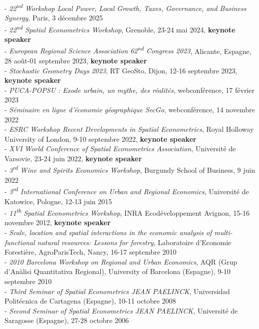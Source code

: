 \documentclass[a4paper,12pt]{article}
\begin{document}
\noindent - \textit{22\textsuperscript{nd} Workshop Local Power, Local Growth, Taxes, Governance, and Business Synergy}, Paris, 3 décembre 2025\\
- \textit{22\textsuperscript{nd} Spatial Econometrics Workshop}, Grenoble, 23-24 mai 2024, \textbf{keynote speaker}\\
- \textit{European Regional Science Association 62\textsuperscript{nd} Congress 2023}, Alicante, Espagne, 28 août-01 septembre 2023, \textbf{keynote speaker} \\
- \textit{Stochastic Geometry Days 2023}, RT GeoSto, Dijon, 12-16 septembre 2023, \textbf{keynote speaker} \\
- \textit{PUCA-POPSU : Exode urbain, un mythe, des réalités}, webconférence, 17 février 2023\\
- \textit{Séminaire en ligne d'économie géographique SecGo}, webconférence, 14 novembre 2022\\
- \textit{ESRC Workshop Recent Developments in Spatial Econometrics}, Royal Holloway University of London, 9-10 septembre 2022, \textbf{keynote speaker} \\
- \textit{XVI World Conference of Spatial Econometrics Association}, Université de Varsovie, 23-24 juin 2022, \textbf{keynote speaker} \\
- \textit{3\textsuperscript{rd} Wine and Spirits Economics Workshop}, Burgundy School of Business, 9 juin 2022 \\
- \textit{3\textsuperscript{rd} International Conference on Urban and Regional Economics}, Université de Katowice, Pologne, 12-13 juin 2015\\
- \textit{11\textsuperscript{th} Spatial Econometrics Workshop}, INRA Ecodéveloppement Avignon, 15-16 novembre 2012, \textbf{keynote speaker}\\
- \textit{Scale, location and spatial interactions in the economic analysis of multi-functional natural resources: Lessons for forestry}, Laboratoire d'Economie Forestière, AgroParisTech, Nancy, 16-17 septembre 2010\\
- \textit{2010 Barcelona Workshop on Regional and Urban Economics}, AQR (Grup d'Anàlisi Quantitativa Regional), University of Barcelona (Espagne), 9-10 septembre 2010\\
- \textit{Third Seminar of Spatial Econometrics JEAN PAELINCK}, Universidad Politécnica de Cartagena (Espagne), 10-11 octobre 2008\\
- \textit {Second Seminar of Spatial Econometrics JEAN PAELINCK}, Université de Saragosse (Espagne), 27-28 octobre 2006\\
\end{document}
